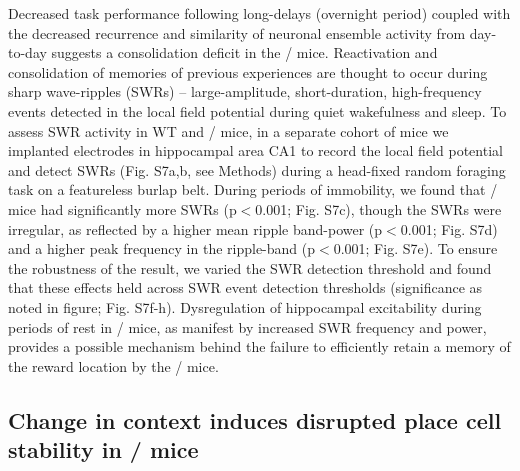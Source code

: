 Decreased task performance following long-delays (overnight period) coupled with the decreased recurrence and similarity of neuronal ensemble activity from day-to-day suggests a consolidation deficit in the \df/ mice. Reactivation and consolidation of memories of previous experiences are thought to occur during sharp wave-ripples (SWRs) – large-amplitude, short-duration, high-frequency events detected in the local field potential \citep{Buzsaki2015}\citep{Diba2007}\citep{Dupret2010a}\citep{Foster2006}\citep{Jadhav2012}\citep{Kudrimoti1999}\citep{Wilson1994} during quiet wakefulness and sleep. To assess SWR activity in WT and \df/ mice, in a separate cohort of mice we implanted electrodes in hippocampal area CA1 to record the local field potential and detect SWRs (Fig. S7a,b, see Methods) during a head-fixed random foraging task on a featureless burlap belt. During periods of immobility, we found that \df/ mice had significantly more SWRs (p$<$0.001; Fig. S7c),  though the SWRs were irregular, as reflected by a higher mean ripple band-power (p$<$0.001; Fig. S7d) and a higher peak frequency in the ripple-band (p$<$0.001; Fig. S7e). To ensure the robustness of the result, we varied the SWR detection threshold and found that these effects held across SWR event detection thresholds (significance as noted in figure; Fig. S7f-h). Dysregulation of hippocampal excitability during periods of rest in \df/ mice, as manifest by increased SWR frequency and power, provides a possible mechanism behind the failure to efficiently retain a memory of the reward location by the \df/ mice.

\subsection{Change in context induces disrupted place cell stability in \df/ mice}

